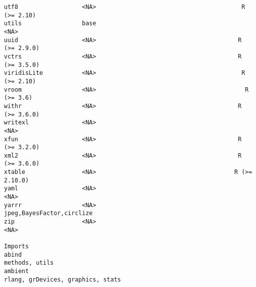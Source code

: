\documentclass[
  letterpaper,
  DIV=11,
  numbers=noendperiod]{scrreprt}
\begin{document}
\begin{verbatim}
utf8                  <NA>                                         R (>= 2.10)
utils                 base                                                <NA>
uuid                  <NA>                                        R (>= 2.9.0)
vctrs                 <NA>                                        R (>= 3.5.0)
viridisLite           <NA>                                         R (>= 2.10)
vroom                 <NA>                                          R (>= 3.6)
withr                 <NA>                                        R (>= 3.6.0)
writexl               <NA>                                                <NA>
xfun                  <NA>                                        R (>= 3.2.0)
xml2                  <NA>                                        R (>= 3.6.0)
xtable                <NA>                                       R (>= 2.10.0)
yaml                  <NA>                                                <NA>
yarrr                 <NA>                           jpeg,BayesFactor,circlize
zip                   <NA>                                                <NA>
                                                                                                                                                                                                                                                                                                                                                                                                                                                                                                                                                                                                                   Imports
abind                                                                                                                                                                                                                                                                                                                                                                                                                                                                                                                                                                                                       methods, utils
ambient                                                                                                                                                                                                                                                                                                                                                                                                                                                                                                                                                                                  rlang, grDevices, graphics, stats

\end{verbatim}
\end{document}
